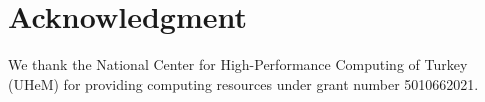 \section*{Acknowledgment}
We thank the National Center for High-Performance Computing of Turkey (UHeM) for providing computing resources under grant number 5010662021.